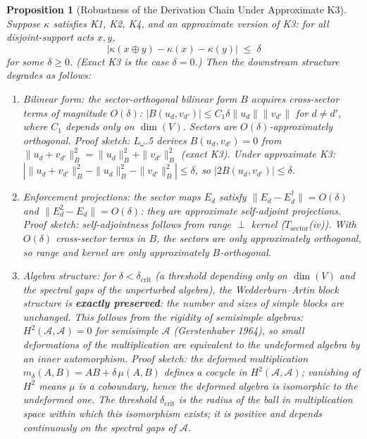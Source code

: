 \documentclass[11pt,a4paper]{article}
\newtheorem{proposition}[theorem]{Proposition}
\theoremstyle{definition}
\begin{document}
\begin{proposition}[Robustness of the Derivation Chain Under Approximate K3]\label{prop:robustness}
Suppose $\kappa$ satisfies K1, K2, K4, and an \emph{approximate} version of K3: for all disjoint-support acts $x, y$,
\[
|\kappa(x \oplus y) - \kappa(x) - \kappa(y)| \;\le\; \delta
\]
for some $\delta \ge 0$.  (Exact K3 is the case $\delta = 0$.)  Then the downstream structure degrades as follows:

\begin{enumerate}[nosep,label=(\roman*),leftmargin=2em]
\item \textit{Bilinear form:} the sector-orthogonal bilinear form $B$ acquires cross-sector terms of magnitude $O(\delta)$: $|B(u_d, v_{d'})| \le C_1 \delta \|u_d\| \|v_{d'}\|$ for $d \ne d'$, where $C_1$ depends only on $\dim(V)$.  Sectors are $O(\delta)$-approximately orthogonal.  \textit{Proof sketch:} $L_\omega$.5 derives $B(u_d, v_{d'}) = 0$ from $\|u_d + v_{d'}\|_B^2 = \|u_d\|_B^2 + \|v_{d'}\|_B^2$ (exact K3).  Under approximate K3: $|\|u_d + v_{d'}\|_B^2 - \|u_d\|_B^2 - \|v_{d'}\|_B^2| \le \delta$, so $|2B(u_d, v_{d'})| \le \delta$.
\item \textit{Enforcement projections:} the sector maps $E_d$ satisfy $\|E_d - E_d^\dagger\| = O(\delta)$ and $\|E_d^2 - E_d\| = O(\delta)$: they are approximate self-adjoint projections.  \textit{Proof sketch:} self-adjointness follows from range $\perp$ kernel ($T_{\mathrm{sector}}$(iv)).  With $O(\delta)$ cross-sector terms in $B$, the sectors are only approximately orthogonal, so range and kernel are only approximately $B$-orthogonal.
\item \textit{Algebra structure:} for $\delta < \delta_{\mathrm{crit}}$ (a threshold depending only on $\dim(V)$ and the spectral gaps of the unperturbed algebra), the Wedderburn--Artin block structure is \textbf{exactly preserved}: the number and sizes of simple blocks are unchanged.  This follows from the \emph{rigidity of semisimple algebras}: $H^2(\mathcal{A}, \mathcal{A}) = 0$ for semisimple $\mathcal{A}$ (Gerstenhaber 1964), so small deformations of the multiplication are equivalent to the undeformed algebra by an inner automorphism.  \textit{Proof sketch:} the deformed multiplication $m_\delta(A,B) = AB + \delta\,\mu(A,B)$ defines a cocycle in $H^2(\mathcal{A}, \mathcal{A})$; vanishing of $H^2$ means $\mu$ is a coboundary, hence the deformed algebra is isomorphic to the undeformed one.  The threshold $\delta_{\mathrm{crit}}$ is the radius of the ball in multiplication space within which this isomorphism exists; it is positive and depends continuously on the spectral gaps of $\mathcal{A}$.

\end{enumerate}
\end{proposition}
\end{document}
